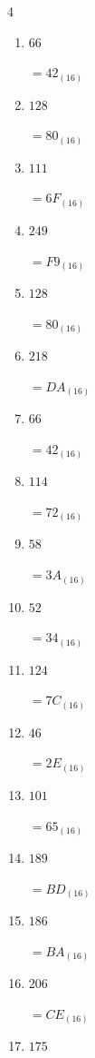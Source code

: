 \begin{multicols}{4}
\begin{enumerate}
  \item $66$

        $=42_{(16)}$

  \item $128$

        $=80_{(16)}$

  \item $111$

        $=6F_{(16)}$

  \item $249$

        $=F9_{(16)}$

  \item $128$

        $=80_{(16)}$

  \item $218$

        $=DA_{(16)}$

  \item $66$

        $=42_{(16)}$

  \item $114$

        $=72_{(16)}$

  \item $58$

        $=3A_{(16)}$

  \item $52$

        $=34_{(16)}$

  \item $124$

        $=7C_{(16)}$

  \item $46$

        $=2E_{(16)}$

\columnbreak %

  \item $101$

        $=65_{(16)}$

  \item $189$

        $=BD_{(16)}$

  \item $186$

        $=BA_{(16)}$

  \item $206$

        $=CE_{(16)}$

  \item $175$


\end{enumerate}
\end{multicols}
